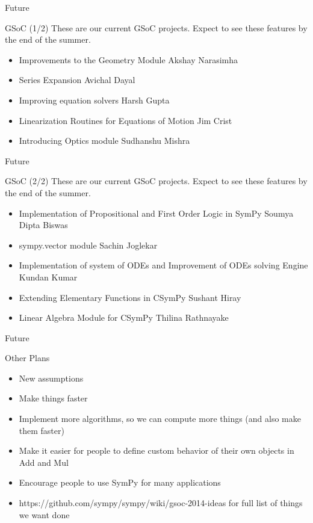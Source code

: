 \documentclass[xcolor=svgnames]{beamer}
\begin{document}
\begin{frame}{Future}
  \begin{block}{GSoC (1/2)}
    These are our current GSoC projects. Expect to see these features by the end
    of the summer.
    \begin{itemize}
    \item \normalsize Improvements to the Geometry Module \small Akshay Narasimha
    \item \normalsize Series Expansion \small Avichal Dayal
    \item \normalsize Improving equation solvers \small Harsh Gupta
    \item \normalsize Linearization Routines for Equations of Motion \small Jim Crist
    \item \normalsize Introducing Optics module \small Sudhanshu Mishra

    \end{itemize}
  \end{block}
\end{frame}

\begin{frame}{Future}
  \begin{block}{GSoC (2/2)}
    These are our current GSoC projects. Expect to see these features by the end
    of the summer.
    \begin{itemize}
    \item \normalsize Implementation of Propositional and First Order Logic in SymPy \small Soumya Dipta Biswas
    \item \normalsize sympy.vector module \small Sachin Joglekar
    \item \normalsize Implementation of system of ODEs and Improvement of ODEs solving Engine \small Kundan Kumar
    \item \normalsize Extending Elementary Functions in CSymPy \small Sushant Hiray
    \item \normalsize Linear Algebra Module for CSymPy \small Thilina Rathnayake

    \end{itemize}
  \end{block}
\end{frame}

\begin{frame}{Future}
\begin{block}{Other Plans}
\begin{itemize}
\item New assumptions
\item Make things faster
\item Implement more algorithms, so we can compute more things (and also make
  them faster)
\item Make it easier for people to define custom behavior of their own objects
  in Add and Mul
\item Encourage people to use SymPy for many applications
\item https://github.com/sympy/sympy/wiki/gsoc-2014-ideas for full list of
  things we want done
\end{itemize}
\end{block}
\end{frame}
\end{document}
